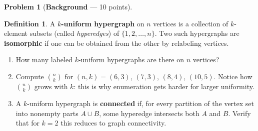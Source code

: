 \documentclass[11pt,letterpaper]{article}
\theoremstyle{definition}
\newtheorem{definition}[theorem]{Definition}
\newtheorem{problem}{Problem}
\theoremstyle{remark}
\begin{document}
\begin{problem}[\textbf{Background} --- 10 points]\label{prob:background}

\begin{definition}
A \textbf{$k$-uniform hypergraph} on $n$ vertices is a collection of $k$-element subsets (called \emph{hyperedges}) of $\{1, 2, \ldots, n\}$. Two such hypergraphs are \textbf{isomorphic} if one can be obtained from the other by relabeling vertices.
\end{definition}

\begin{enumerate}[label=(\alph*)]
  \item How many labeled $k$-uniform hypergraphs are there on $n$ vertices?

  \item Compute $\binom{n}{k}$ for $(n, k) = (6, 3)$, $(7, 3)$, $(8, 4)$, $(10, 5)$. Notice how $\binom{n}{k}$ grows with $k$: this is why enumeration gets harder for larger uniformity.

  \item A $k$-uniform hypergraph is \textbf{connected} if, for every partition of the vertex set into nonempty parts $A \cup B$, some hyperedge intersects both $A$ and $B$. Verify that for $k = 2$ this reduces to graph connectivity.
\end{enumerate}
\end{problem}

\bigskip

\end{document}
